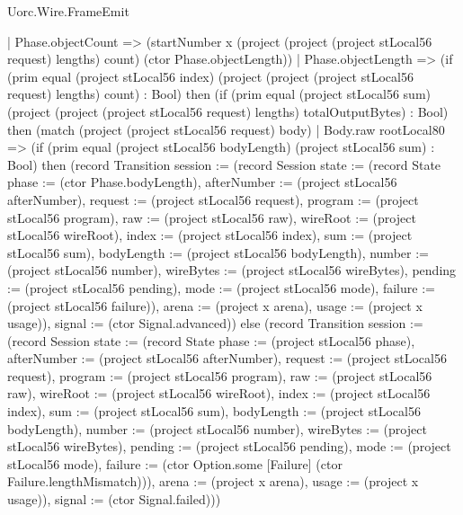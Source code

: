 \begin{lexlean}{Uorc.Wire.FrameEmit}
\begin{semanticmodule}
{        | Phase.objectCount => (startNumber x (project (project (project stLocal56 request) lengths) count) (ctor Phase.objectLength))
        | Phase.objectLength => (if (prim equal (project stLocal56 index) (project (project (project stLocal56 request) lengths) count) : Bool) then (if (prim equal (project stLocal56 sum) (project (project (project stLocal56 request) lengths) totalOutputBytes) : Bool) then (match (project (project stLocal56 request) body)
          | Body.raw rootLocal80 => (if (prim equal (project stLocal56 bodyLength) (project stLocal56 sum) : Bool) then (record Transition {session := (record Session {state := (record State {phase := (ctor Phase.bodyLength), afterNumber := (project stLocal56 afterNumber), request := (project stLocal56 request), program := (project stLocal56 program), raw := (project stLocal56 raw), wireRoot := (project stLocal56 wireRoot), index := (project stLocal56 index), sum := (project stLocal56 sum), bodyLength := (project stLocal56 bodyLength), number := (project stLocal56 number), wireBytes := (project stLocal56 wireBytes), pending := (project stLocal56 pending), mode := (project stLocal56 mode), failure := (project stLocal56 failure)}), arena := (project x arena), usage := (project x usage)}), signal := (ctor Signal.advanced)}) else (record Transition {session := (record Session {state := (record State {phase := (project stLocal56 phase), afterNumber := (project stLocal56 afterNumber), request := (project stLocal56 request), program := (project stLocal56 program), raw := (project stLocal56 raw), wireRoot := (project stLocal56 wireRoot), index := (project stLocal56 index), sum := (project stLocal56 sum), bodyLength := (project stLocal56 bodyLength), number := (project stLocal56 number), wireBytes := (project stLocal56 wireBytes), pending := (project stLocal56 pending), mode := (project stLocal56 mode), failure := (ctor Option.some [Failure] (ctor Failure.lengthMismatch))}), arena := (project x arena), usage := (project x usage)}), signal := (ctor Signal.failed)}))
}
\end{semanticmodule}
\end{lexlean}
